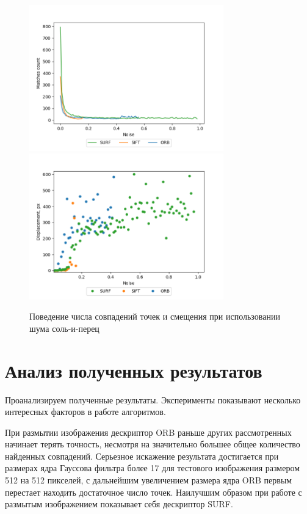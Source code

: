 {{{{   			\begin{figure}[H]
   				\centering                             
   				\includegraphics[width=0.75\textwidth,keepaspectratio]{ex2/sp/Rand_noises_matches.png}   
   				\includegraphics[width=0.75\textwidth,keepaspectratio]{ex2/sp/Rand_noises_displacement.png}       
   				\centering\caption{ Поведение числа совпадений точек и смещения при использовании шума соль-и-перец}
   				\label{rand_noises_sp}                           
   			\end{figure}   
   			
}
}

\newpage
\section{Анализ полученных результатов}
{
    Проанализируем полученные результаты. Эксперименты показывают несколько интересных факторов в работе алгоритмов. 
    
    При размытии изображения дескриптор ORB раньше других рассмотренных начинает терять точность, несмотря на значительно большее общее количество найденных совпадений. Серьезное искажение результата достигается при размерах ядра Гауссова фильтра более 17 для тестового изображения размером 512 на 512 пикселей, с дальнейшим увеличением размера ядра ORB первым перестает находить достаточное число точек. Наилучшим образом при работе с размытым изображением показывает себя дескриптор SURF.
    
}}}

